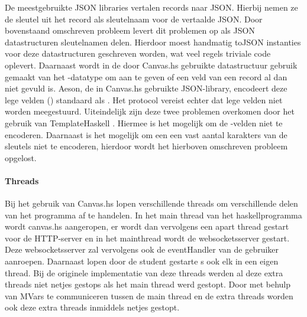 De meestgebruikte JSON libraries vertalen records naar JSON. Hierbij nemen ze de sleutel uit het record als sleutelnaam voor de vertaalde JSON. Door bovenstaand omschreven probleem levert dit problemen op als JSON datastructuren sleutelnamen delen. Hierdoor moest handmatig toJSON instanties voor deze datastructuren geschreven worden, wat veel regels triviale code oplevert. Daarnaast wordt in de door Canvas.hs gebruikte datastructuur gebruik gemaakt van het -datatype om aan te geven of een veld van een record al dan niet gevuld is. Aeson, de in Canvas.hs gebruikte JSON-library, encodeert deze lege velden () standaard als . Het protocol vereist echter dat lege velden niet worden meegestuurd. Uiteindelijk zijn deze twee problemen overkomen door het gebruik van TemplateHaskell \cite{AesonTH}. Hiermee is het mogelijk om de -velden niet te encoderen. Daarnaast is het mogelijk om een een vast aantal karakters van de sleutels niet te encoderen, hierdoor wordt het hierboven omschreven probleem opgelost. 


\paragraph{Threads}
Bij het gebruik van Canvas.hs lopen verschillende threads om verschillende delen van het programma af te handelen. In het main thread van het haskellprogramma wordt canvas.hs aangeropen, er wordt dan vervolgens een apart thread gestart voor de HTTP-server en in het mainthread wordt de websocketsserver gestart. Deze websocketsserver zal vervolgens ook de eventHandler van de gebruiker aanroepen. Daarnaast lopen door de student gestarte s ook elk in een eigen thread. Bij de originele implementatie van deze threads werden al deze extra threads niet netjes gestops als het main thread werd gestopt. Door met behulp van MVars te communiceren tussen de main thread en de extra threads worden ook deze extra threads inmiddels netjes gestopt.